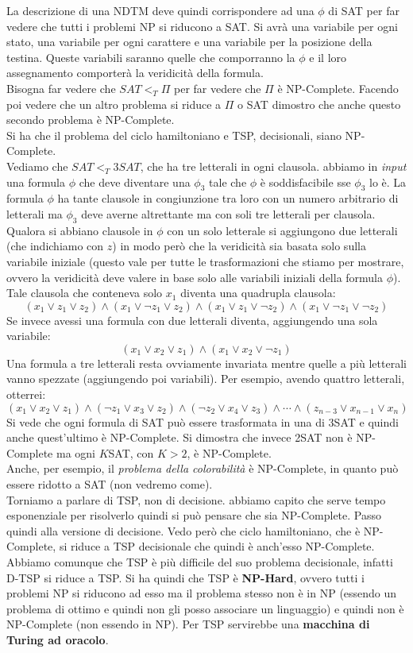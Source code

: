 La descrizione di una NDTM deve quindi corrispondere ad una $\phi$ di SAT per
far vedere che tutti i problemi NP si riducono a SAT. Si avrà una variabile per
ogni stato, una variabile per ogni carattere e una variabile per la posizione
della testina. Queste variabili saranno quelle che comporranno la $\phi$ e il
loro assegnamento comporterà la veridicità della formula.\\
Bisogna far vedere che $SAT<_T \Pi$ per far vedere che $\Pi$ è
NP-Complete. Facendo poi vedere che un altro problema si riduce a $\Pi$ o SAT
dimostro che anche questo secondo problema è NP-Complete. \\
Si ha che il problema del ciclo hamiltoniano e TSP, decisionali, siano
NP-Complete.\\
Vediamo che $SAT<_T 3SAT$, che ha tre letterali in ogni clausola. abbiamo in \textit{input}
una formula $\phi$ che deve diventare una $\phi_3$ tale che $\phi$ è
soddisfacibile sse $\phi_3$ lo è. La formula $\phi$ ha tante clausole in
congiunzione tra loro con un numero arbitrario di letterali ma $\phi_3$ deve
averne altrettante ma con soli tre letterali per clausola. Qualora si abbiano
clausole in $\phi$ con un solo letterale si aggiungono due letterali (che
indichiamo con $z$) in modo
però che la veridicità sia basata solo sulla variabile iniziale (questo vale per
tutte le trasformazioni che stiamo per mostrare, ovvero la veridicità deve
valere in base solo alle variabili iniziali della formula $\phi$). Tale clausola
che conteneva solo $x_1$ diventa una quadrupla clausola:
\[(x_1\lor z_1\lor z_2)\land (x_1\lor\neg z_1\lor z_2)\land (x_1\lor z_1\lor\neg
  z_2)\land(x_1\lor\neg z_1\lor\neg z_2)\] 
Se invece avessi una formula con due letterali diventa, aggiungendo una sola
variabile: 
\[(x_1\lor x_2\lor z_1)\land (x_1\lor x_2\lor \neg z_1)\]
Una formula a tre letterali resta ovviamente invariata mentre quelle a più
letterali vanno spezzate (aggiungendo poi variabili). Per esempio, avendo
quattro letterali, otterrei:
\[(x_1\lor x_2\lor z_1)\land (\neg z_1\lor x_3\lor z_2)\land (\neg z_2\lor
  x_4\lor z_3)\land\cdots\land(z_{n-3}\lor x_{n-1}\lor x_n)\]
Si vede che ogni formula di SAT può essere trasformata in una di 3SAT e quindi
anche quest'ultimo è NP-Complete. Si dimostra che invece 2SAT non è NP-Complete
ma ogni $K$SAT, con $K>2$, è NP-Complete.\\
Anche, per esempio, il \textit{problema della colorabilità} è NP-Complete, in
quanto può essere ridotto a SAT (non vedremo come).\\
Torniamo a parlare di TSP, non di decisione. abbiamo capito che serve tempo
esponenziale per risolverlo quindi si può pensare che sia NP-Complete. Passo
quindi alla versione di decisione. Vedo però che ciclo
hamiltoniano, che è NP-Complete, si riduce a TSP decisionale che quindi è
anch'esso NP-Complete. Abbiamo comunque che TSP è più difficile del suo problema
decisionale, infatti D-TSP si riduce a TSP. Si ha quindi che TSP è
\textbf{NP-Hard}, ovvero tutti i problemi NP si riducono ad esso ma il problema
stesso non è in NP (essendo un problema di ottimo e quindi non gli posso
associare un linguaggio) e quindi non è NP-Complete (non essendo in NP). Per
TSP servirebbe una \textbf{macchina di Turing ad oracolo}.
